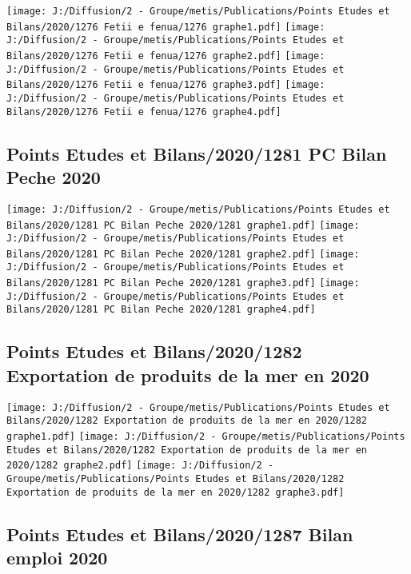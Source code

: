 \documentclass[
]{article}
\begin{document}
\texttt{[image: J:/Diffusion/2 - Groupe/metis/Publications/Points Etudes et Bilans/2020/1276 Fetii e fenua/1276 graphe1.pdf]}
\texttt{[image: J:/Diffusion/2 - Groupe/metis/Publications/Points Etudes et Bilans/2020/1276 Fetii e fenua/1276 graphe2.pdf]}
\texttt{[image: J:/Diffusion/2 - Groupe/metis/Publications/Points Etudes et Bilans/2020/1276 Fetii e fenua/1276 graphe3.pdf]}
\texttt{[image: J:/Diffusion/2 - Groupe/metis/Publications/Points Etudes et Bilans/2020/1276 Fetii e fenua/1276 graphe4.pdf]}

\hypertarget{points-etudes-et-bilans20201281-pc-bilan-peche-2020}{%
\subsection{Points Etudes et Bilans/2020/1281 PC Bilan Peche
2020}\label{points-etudes-et-bilans20201281-pc-bilan-peche-2020}}

\texttt{[image: J:/Diffusion/2 - Groupe/metis/Publications/Points Etudes et Bilans/2020/1281 PC Bilan Peche 2020/1281 graphe1.pdf]}
\texttt{[image: J:/Diffusion/2 - Groupe/metis/Publications/Points Etudes et Bilans/2020/1281 PC Bilan Peche 2020/1281 graphe2.pdf]}
\texttt{[image: J:/Diffusion/2 - Groupe/metis/Publications/Points Etudes et Bilans/2020/1281 PC Bilan Peche 2020/1281 graphe3.pdf]}
\texttt{[image: J:/Diffusion/2 - Groupe/metis/Publications/Points Etudes et Bilans/2020/1281 PC Bilan Peche 2020/1281 graphe4.pdf]}

\hypertarget{points-etudes-et-bilans20201282-exportation-de-produits-de-la-mer-en-2020}{%
\subsection{Points Etudes et Bilans/2020/1282 Exportation de produits de
la mer en
2020}\label{points-etudes-et-bilans20201282-exportation-de-produits-de-la-mer-en-2020}}

\texttt{[image: J:/Diffusion/2 - Groupe/metis/Publications/Points Etudes et Bilans/2020/1282 Exportation de produits de la mer en 2020/1282 graphe1.pdf]}
\texttt{[image: J:/Diffusion/2 - Groupe/metis/Publications/Points Etudes et Bilans/2020/1282 Exportation de produits de la mer en 2020/1282 graphe2.pdf]}
\texttt{[image: J:/Diffusion/2 - Groupe/metis/Publications/Points Etudes et Bilans/2020/1282 Exportation de produits de la mer en 2020/1282 graphe3.pdf]}

\hypertarget{points-etudes-et-bilans20201287-bilan-emploi-2020}{%
\subsection{Points Etudes et Bilans/2020/1287 Bilan emploi
2020}\label{points-etudes-et-bilans20201287-bilan-emploi-2020}}
\end{document}
